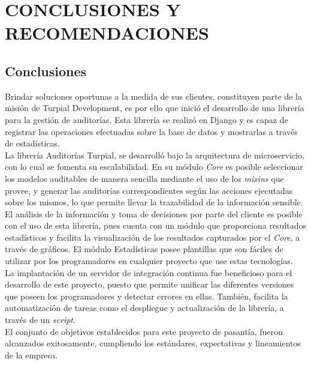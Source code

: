 \chapter*{\textbf{CONCLUSIONES Y RECOMENDACIONES}}

\thispagestyle{empty}

\section*{Conclusiones}

Brindar soluciones oportunas a la medida de sus clientes, constituyen parte de la misión de Turpial Development, es por ello que inició el desarrollo de una librería para la gestión de auditorías. Esta librería se realizó en Django y es capaz de registrar las operaciones efectuadas sobre la base de datos y mostrarlas a través de estadísticas.\\

La librería Auditorías Turpial, se desarrolló bajo la arquitectura de microservicio, con lo cual se fomenta su escalabilidad. En su módulo \textit{Core} es posible seleccionar los modelos auditables de manera sencilla mediante el uso de los \textit{mixins} que provee, y generar las auditorías correspondientes según las acciones ejecutadas sobre los mismos, lo que permite llevar la trazabilidad de la información sensible.\\

El análisis de la información y toma de decisiones por parte del cliente es posible con el uso de esta librería, pues cuenta con un módulo que proporciona resultados estadísticos y facilita la visualización de los resultados capturados por el \textit{Core}, a través de gráficos. El módulo Estadísticas posee plantillas que son fáciles de utilizar por los programadores en cualquier proyecto que use estas tecnologías.\\

La implantación de un servidor de integración continua fue beneficioso para el desarrollo de este proyecto, puesto que permite unificar las diferentes versiones que poseen los programadores y detectar errores en ellas. También, facilita la automatización de tareas como el despliegue y actualización de la librería, a través de un \textit{script}.\\

El conjunto de objetivos establecidos para este proyecto de pasantía, fueron alcanzados  exitosamente, cumpliendo los estándares, expectativas y lineamientos de la empresa.\\

